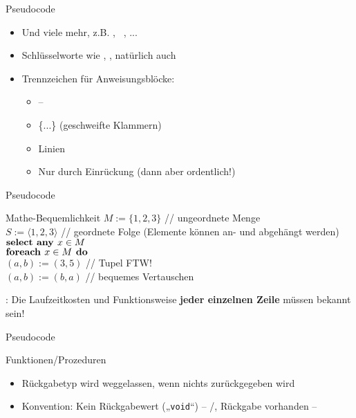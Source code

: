 \begin{frame}{Pseudocode}
	\begin{itemize}
		\large
		\item Und viele mehr, z.B. , \KwFor\ \KwEach, ...
		\item Schlüsselworte wie \KwContinue, \KwBreak,  natürlich auch
		\item Trennzeichen für Anweisungsblöcke:\\
		\begin{itemize}
			\item {} -- 
			\item \{...\} \quad  (geschweifte Klammern)
			\item Linien
			\item Nur durch Einrückung (dann aber ordentlich!)
		\end{itemize}
	\end{itemize}
\end{frame}

\begin{frame}{Pseudocode}
	\begin{exampleblock}{Mathe-Bequemlichkeit}
		$M := \{1, 2, 3\}$ \quad // ungeordnete Menge \\[0,125cm]
		$S := \langle1, 2, 3\rangle$ \quad // geordnete Folge (Elemente können an- und abgehängt werden)\\[0,125cm]
		$\KwSty{select any } x \in M$ \\[0,125cm]
		$\KwSty{foreach } x \in M \KwSty{ do}$ \\[0,125cm]
		$(a, b) := (3, 5)$ \quad // Tupel FTW! \smiley \\[0,125cm] 
		$(a, b) := (b, a)$ \quad // bequemes Vertauschen
	\end{exampleblock}
	: Die Laufzeitkosten und Funktionsweise \textbf{jeder einzelnen Zeile} müssen bekannt sein! \\
\end{frame}

\begin{frame}{Pseudocode}
	\begin{exampleblock}{Funktionen/Prozeduren}
		\begin{algorithm}[H]
			\DontPrintSemicolon
		\end{algorithm}
	\end{exampleblock}
	\begin{itemize}
		\item Rückgabetyp wird weggelassen, wenn nichts zurückgegeben wird
		\item Konvention: Kein Rückgabewert („\texttt{void}“) – \KwProcedure/\KwMethod, Rückgabe vorhanden – \KwFunction
	\end{itemize}
\end{frame}


